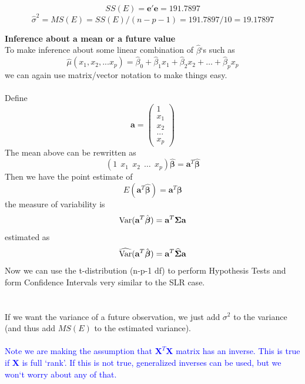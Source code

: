 $$SS(E) = \textbf{e}'\textbf{e} = 191.7897$$
$$\hat{\sigma}^2=MS(E) = SS(E)/(n-p-1) = 191.7897/10 = 19.17897 $$

\newpage

\Large \textbf{Inference about a mean or a future value}\large\\

To make inference about some linear combination of $\hat\beta$`s such as 
$$\hat{\mu}(x_1,x_2,...x_p)=\hat{\beta}_{0}+\hat{\beta}_{1}x_{1}+\hat{\beta}_{2}x_{2}+\ldots+\hat{\beta}_{p}x_{p}$$
we can again use matrix/vector notation to make things easy. \\~\\
Define 
$$\textbf{a}=\left(\begin{array}{c}1 \\x_1\\x_2\\...\\x_p\end{array}\right)$$
The mean above can be rewritten as
$$(1~~x_{1}~~x_{2}~~\ldots~~x_{p})\hat{\boldsymbol{\beta}}=\textbf{a}^{T}\hat{\boldsymbol{\beta}}$$
Then we have the point estimate of
$$E(\textbf{a}^{T}\hat{\boldsymbol{\beta}}) = \textbf{a}^{T}\boldsymbol{\beta}$$
the measure of variability is 
$$\mbox{Var}(\textbf{a}^{T}\hat{\boldsymbol{\beta}}) = \textbf{a}^{T}\boldsymbol{\Sigma}\textbf{a}$$
estimated as
$$\widehat{\mbox{Var}}(\textbf{a}^{T}\hat{\boldsymbol{\beta}}) = \textbf{a}^{T}\widehat{\boldsymbol{\Sigma}}\textbf{a}$$
Now we can use the t-distribution (n-p-1 df) to perform Hypothesis Tests and form Confidence Intervals very similar to the SLR case.\\~\\~\\
If we want the variance of a future observation, we just add $\sigma^2$ to the variance (and thus add $MS(E)$ to the estimated variance).\\~\\

\textcolor{blue}{Note we are making the assumption that $\textbf{X}^{T}\textbf{X}$ matrix has an inverse.  This is true if $\textbf{X}$ is full `rank'.  If this is not true, generalized inverses can be used, but we won`t worry about any of that.}\\~\\

\newpage

